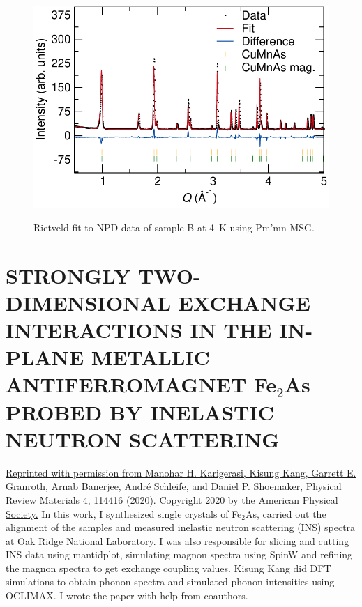\documentclass[10pt,doublespacing,edeposit]{uiucthesis2020}
\begin{document}
\begin{mainmatter}
\begin{figure}[h]
\centering\includegraphics[width=0.7\columnwidth]{figures/ch7/suppl_ECHIDNA_4K_sample_B_cropped.pdf} \\
\caption{\label{fig:4K_mag_structure}
Rietveld fit to NPD data of sample B at 4~K using Pm'mn MSG.
} 
\end{figure}


\chapter{STRONGLY TWO-DIMENSIONAL EXCHANGE INTERACTIONS IN THE IN-PLANE METALLIC ANTIFERROMAGNET Fe$_2$As PROBED BY INELASTIC NEUTRON SCATTERING}

\vspace{40mm}


\href{https://doi.org/10.1103/PhysRevMaterials.4.114416}{Reprinted with permission from Manohar H. Karigerasi, Kisung Kang, Garrett E. Granroth, Arnab Banerjee, Andr\'e Schleife, and Daniel P. Shoemaker, Physical Review Materials 4, 114416 (2020). Copyright 2020 by the American Physical Society.} In this work, I synthesized single crystals of Fe$_2$As, carried out the alignment of the samples and measured inelastic neutron scattering (INS) spectra at Oak Ridge National Laboratory. I was also responsible for slicing and cutting INS data using mantidplot, simulating magnon spectra using SpinW and refining the magnon spectra to get exchange coupling values. Kisung Kang did DFT simulations to obtain phonon spectra and simulated phonon intensities using OCLIMAX. I wrote the paper with help from coauthors.




\end{mainmatter}
\end{document}
